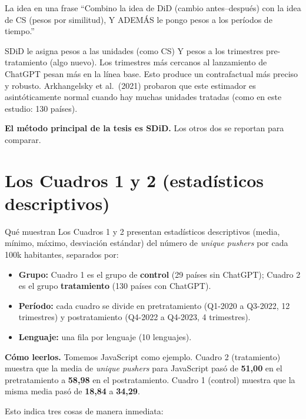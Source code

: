 \documentclass[11pt,a4paper]{article}
\begin{document}
\begin{ideabox}{La idea en una frase}
``Combino la idea de DiD (cambio antes--después) con la idea de CS (pesos por similitud), Y ADEMÁS le pongo pesos a los períodos de tiempo.''
\end{ideabox}

SDiD le asigna pesos a las unidades (como CS) Y pesos a los trimestres pre-tratamiento (algo nuevo). Los trimestres más cercanos al lanzamiento de ChatGPT pesan más en la línea base. Esto produce un contrafactual más preciso y robusto. Arkhangelsky et al.\ (2021) probaron que este estimador es asintóticamente normal cuando hay muchas unidades tratadas (como en este estudio: 130 países).

\textbf{El método principal de la tesis es SDiD.} Los otros dos se reportan para comparar.

\section{Los Cuadros 1 y 2 (estadísticos descriptivos)}

\begin{lectura}{Qué muestran}
Los Cuadros 1 y 2 presentan estadísticos descriptivos (media, mínimo, máximo, desviación estándar) del número de \textit{unique pushers} por cada 100k habitantes, separados por:
\begin{itemize}[leftmargin=*]
  \item \textbf{Grupo:} Cuadro 1 es el grupo de \textbf{control} (29 países sin ChatGPT); Cuadro 2 es el grupo \textbf{tratamiento} (130 países con ChatGPT).
  \item \textbf{Período:} cada cuadro se divide en pretratamiento (Q1-2020 a Q3-2022, 12 trimestres) y postratamiento (Q4-2022 a Q4-2023, 4 trimestres).
  \item \textbf{Lenguaje:} una fila por lenguaje (10 lenguajes).
\end{itemize}
\end{lectura}

\textbf{Cómo leerlos.} Tomemos JavaScript como ejemplo. Cuadro 2 (tratamiento) muestra que la media de \textit{unique pushers} para JavaScript pasó de \textbf{51,00} en el pretratamiento a \textbf{58,98} en el postratamiento. Cuadro 1 (control) muestra que la misma media pasó de \textbf{18,84} a \textbf{34,29}.

Esto indica tres cosas de manera inmediata:
\end{document}
